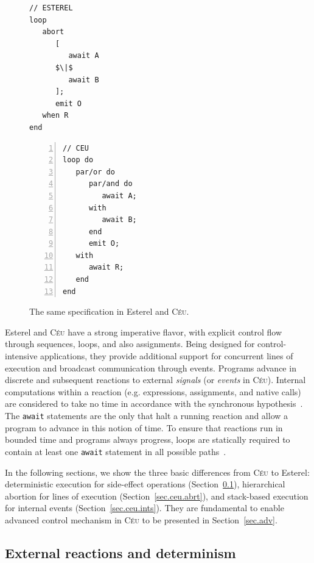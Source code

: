 \documentclass{acm_proc_article-sp}
\newcommand{\CEU}{\textsc{C\'{e}u}\xspace}
\newcommand{\code}[1] {{\small{\texttt{#1}}}}
\newcommand{\1}{\;}
\newcommand{\2}{\;\;}
\newcommand{\3}{\;\;\;}
\newcommand{\5}{\;\;\;\;\;}
\begin{document}
\begin{figure}[t]
\begin{minipage}[t]{0.44\linewidth}
\begin{lstlisting}[mathescape=true]
// ESTEREL
loop
   abort
      [
         await A
      $\|$
         await B
      ];
      emit O
   when R
end
\end{lstlisting}
\end{minipage}
%
\begin{minipage}[t]{0.55\linewidth}
\begin{lstlisting}[numbers=left,xleftmargin=3.5em]
// CEU
loop do
   par/or do
      par/and do
         await A;
      with
         await B;
      end
      emit O;
   with
      await R;
   end
end
\end{lstlisting}
\end{minipage}
\caption{ The same specification in Esterel and \CEU. %
{\small
}
\label{lst.abro}
}
\end{figure}

Esterel and \CEU have a strong imperative flavor, with explicit control flow 
through sequences, loops, and also assignments.
Being designed for control-intensive applications, they provide additional 
support for concurrent lines of execution and broadcast communication through 
events.
%
Programs advance in discrete and subsequent reactions to external 
\emph{signals} (or \emph{events} in \CEU).
Internal computations within a reaction (e.g. expressions, assignments, and 
native calls) are considered to take no time in accordance with the synchronous 
hypothesis~\cite{rp.hypothesis}.
The \code{await} statements are the only that halt a running reaction and allow 
a program to advance in this notion of time.
%
To ensure that reactions run in bounded time and programs always progress, 
loops are statically required to contain at least one \code{await} statement in 
all possible paths~\cite{ceu.sensys,esterel.primer}.

In the following sections, we show the three basic differences from \CEU to 
Esterel: deterministic execution for side-effect operations 
(Section~\ref{sec.ceu.det}), hierarchical abortion for lines of execution 
(Section~\ref{sec.ceu.abrt}), and stack-based execution for internal events 
(Section~\ref{sec.ceu.ints}).
%
They are fundamental to enable advanced control mechanism in \CEU to be 
presented in Section~\ref{sec.adv}.

\newpage %
\subsection{External reactions and determinism}
\label{sec.ceu.det}
\end{document}
